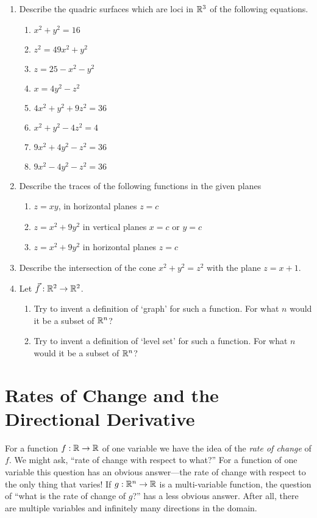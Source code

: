 \begin{exercises}
\begin{enumerate}
	\item   Describe the quadric surfaces which are loci in $\mathbb{R}^3$
	of the following equations. 
	\begin{enumerate}
		\item $x^2 + y^2 = 16$ 
		\item $z^2 = 49x^2 + y^2$ 
		\item $z= 25 - x^2 - y^2$ 
		\item $x=4y^2-z^2$ 
		\item $4x^2 + y^2 + 9z^2 = 36$ 
		\item $x^2 + y^2 - 4z^2 = 4$ 
		\item $9x^2 + 4y^2 -z^2 = 36$ 
		\item $9x^2 - 4y^2 - z^2 = 36$
	\end{enumerate}

	\item   Describe the traces of the following functions in the given planes
	\begin{enumerate}
		\item $z=xy$, in horizontal planes  $z = c$ 
		\item $z=x^2+9y^2$ in vertical planes $x = c$ or $y = c$ 
		\item $z=x^2+9y^2$ in horizontal planes  $z = c$
	\end{enumerate}

	\item   Describe the intersection of the cone $x^2 + y^2 = z^2$ with
	the plane $z = x + 1$.  

	\item   Let $\vec f:\mathbb{R}^2 \to \mathbb{R}^2$.  
	\begin{enumerate}
		\item Try to invent a definition of `graph' for such a function.   For
		    what $n$ would it be a subset of $\mathbb{R}^n$? 
		\item Try to invent a definition of `level set' for such a function.
		    For what $n$ would it be a subset of $\mathbb{R}^n$?
	\end{enumerate}

\end{enumerate}
\end{exercises}

\section{Rates of Change and the Directional Derivative}
	
For a function $f:\mathbb{R}\to\mathbb{R}$ of one variable we have the idea of
the \emph{rate of change} of $f$.  We might ask, ``rate of change with
respect to what?''  For a function of one variable this question has an obvious
answer---the rate of change with respect to the only thing that varies!
If $g:\mathbb{R}^n\to\mathbb{R}$ is a multi-variable function, the question of ``what is the rate of change
of $g$?'' has a less obvious answer.  After all, there are multiple variables and
infinitely many directions in the domain.


